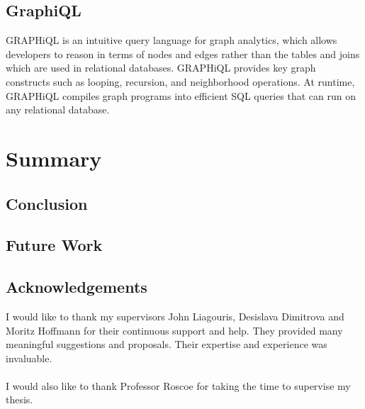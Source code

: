 \documentclass[11pt,singlecolumn]{scrartcl}
\begin{document}
\subsection{GraphiQL}
GRAPHiQL is an intuitive query language for graph analytics, which allows developers to reason in terms of nodes and edges rather than the tables and joins which are used in relational databases. GRAPHiQL provides key graph constructs such as looping, recursion, and neighborhood operations. At runtime, GRAPHiQL compiles graph programs into efficient SQL queries that can run on any relational database. \cite {Graphiql}
\clearpage

\section{Summary}

\subsection{Conclusion}

\subsection{Future Work}
\subsection{Acknowledgements}
I would like to thank my supervisors John Liagouris, Desislava Dimitrova and Moritz Hoffmann for their continuous support and help. They provided many meaningful suggestions and proposals. Their expertise and experience was invaluable.\\\\
I would also like to thank Professor Roscoe for taking the time to supervise my thesis.

\clearpage


{}

\end{document}
